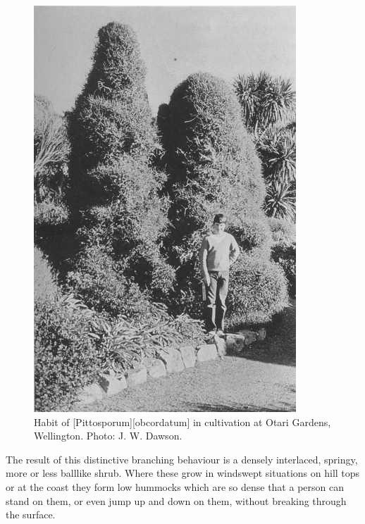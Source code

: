 \begin{figure}[htb]
\begin{minipage}[t]{0.291\textwidth}
    	\includegraphics[width=\textwidth]{graphics/figure75pittosporum.jpg}
    	\caption[Habit of \emph{Pittosporum obcordatum}]{Habit of [Pittosporum][obcordatum] in cultivation at Otari Gardens, Wellington.
    	Photo: J. W. Dawson.}%
    	\label{fig:75pittosporum}
	\end{minipage}
\end{figure}
The result of this distinctive branching behaviour is a densely interlaced, springy, more or less balllike shrub.
Where these grow in windswept situations on hill tops or at the coast they form low hummocks which are so dense that a person can stand on them, or even jump up and down on them, without breaking through the surface.

